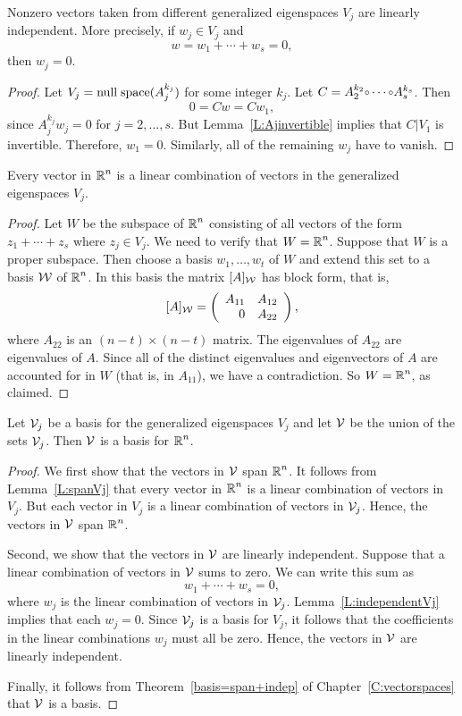 \documentclass{ximera}
\begin{document}
\begin{lemma}  \label{L:independentVj}
Nonzero vectors taken from different generalized eigenspaces $V_j$ are 
linearly independent.  More precisely, if $w_j\in V_j$ and 
\[
w = w_1 + \cdots + w_s = 0,
\]
then $w_j=0$.  
\end{lemma}

\begin{proof} Let $V_j={\rm null\;space}(A_j^{k_j})$ for some integer $k_j$.  Let
$C=A_2^{k_2}\compose\cdots\compose A_s^{k_s}$. Then 
\[
0 = Cw = Cw_1,
\]
since $A_j^{k_j}w_j=0$ for $j=2,\ldots,s$.   But Lemma~\ref{L:Ajinvertible} 
implies that $C|V_1$ is invertible.  Therefore, $w_1=0$.  Similarly, all of 
the remaining $w_j$ have to vanish.  \end{proof}

\begin{lemma}  \label{L:spanVj}
Every vector in $\mbox{$\Bbb{R}$}^n$ is a linear combination of vectors in the generalized 
eigenspaces $V_j$.
\end{lemma}

\begin{proof}  Let $W$ be the subspace
of $\mbox{$\Bbb{R}$}^n$ consisting of all vectors of the form $z_1+\cdots +z_s$ where 
$z_j\in V_j$.  We need to verify that $W=\mbox{$\Bbb{R}$}^n$.  Suppose that $W$ is a 
proper subspace.  Then choose a basis $w_1,\ldots,w_t$ of $W$ and extend
this set to a basis ${\cal W}$ of $\mbox{$\Bbb{R}$}^n$.  In this basis the matrix
$[A]_{\cal W}$ has block form, that is,
\[
[A]_{\cal W} = \left(\begin{array}{rr} A_{11} & A_{12}\\ 0 &A_{22}\end{array}\right),
\]
where $A_{22}$ is an $(n-t)\times(n-t)$ matrix.  The eigenvalues of $A_{22}$ 
are eigenvalues of $A$.  Since all of the distinct eigenvalues and 
eigenvectors of $A$ are accounted for in $W$ (that is, in $A_{11}$), we have 
a contradiction.  So $W=\mbox{$\Bbb{R}$}^n$, as claimed.  \end{proof}

\begin{lemma}  \label{L:basisunion}
Let ${\cal V}_j$ be a basis for the generalized eigenspaces $V_j$ and let 
${\cal V}$ be the union of the sets ${\cal V}_j$.  Then ${\cal V}$ is a basis
for $\mbox{$\Bbb{R}$}^n$.
\end{lemma}

\begin{proof}  We first show that the vectors in ${\cal V}$ span $\mbox{$\Bbb{R}$}^n$.  It follows 
from Lemma~\ref{L:spanVj} that every vector in $\mbox{$\Bbb{R}$}^n$ is a linear combination
of vectors in $V_j$.  But each vector in $V_j$ is a linear combination of
vectors in ${\cal V}_j$.  Hence, the vectors in ${\cal V}$ span $\mbox{$\Bbb{R}$}^n$.

Second, we show that the vectors in ${\cal V}$ are linearly independent. 
Suppose that a linear combination of vectors in ${\cal V}$ sums to zero.  
We can write this sum as 
\[
w_1 + \cdots + w_s = 0,
\]
where $w_j$ is the linear combination of vectors in ${\cal V}_j$. 
Lemma~\ref{L:independentVj} implies that each $w_j=0$.  Since ${\cal V}_j$ is
a basis for $V_j$, it follows that the coefficients in the linear
combinations $w_j$ must all be zero.  Hence, the vectors in ${\cal V}$ are 
linearly independent.

Finally, it follows from Theorem~\ref{basis=span+indep} of 
Chapter~\ref{C:vectorspaces} that ${\cal V}$ is a basis.  \end{proof}
\end{document}
